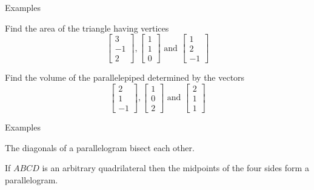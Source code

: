 \documentclass{beamer}
\begin{document}
\begin{frame}{Examples}
\begin{example}
Find the area of the triangle having vertices
\begin{equation*}
\left[
\begin{array}{c}
3\\
-1\\
2
\end{array}
\right], \left[
\begin{array}{c}
1\\
1\\
0
\end{array}
\right]\text{ and } \left[
\begin{array}{c}
1\\
2\\
-1
\end{array}
\right]
\end{equation*}
\end{example}
\begin{example}
Find the volume of the parallelepiped determined by the vectors
\begin{equation*}
\left[
\begin{array}{c}
2\\
1\\
-1
\end{array}
\right], \left[
\begin{array}{c}
1\\
0\\
2
\end{array}
\right]\text{ and } \left[
\begin{array}{c}
2\\
1\\
1
\end{array}
\right]
\end{equation*}
\end{example}
\end{frame}

\begin{frame}{Examples}
    \begin{example}
        The diagonals of a parallelogram bisect each other.
      \end{example}
      \begin{example}
        If $ABCD$ is an arbitrary quadrilateral then the midpoints of the four sides form a parallelogram.
      \end{example}
\end{frame}
\end{document}

